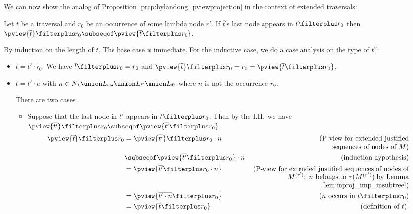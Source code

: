 We can now show the analog of Proposition \ref{prop:hylandong_pviewprojection} in the context of extended traversals:
\begin{proposition}
\label{prop:analog_pviewprojection} Let $t$ be a traversal and $r_0$
be an occurrence of some lambda node $r'$.
If $\overline{t}$'s last node appears in $t\filterplus r_0$ then
 $\pview{ \overline{t}}  \filterplus r_0 \subseqof \pview{ \overline{t}\filterplus
 r_0}$.
\end{proposition}
\proof
By induction on the length of $t$. The base case is immediate. For the inductive case,
we do a case analysis on the type of $t^\omega$:
    \begin{itemize}
    \item $t =  t' \cdot r_0$. We have $\overline{t} \filterplus r_0 = r_0$ and
     $\pview{\overline{t}} \filterplus r_0 = r_0 = \pview{\overline{t} \filterplus r_0}$.

    \item $t = t' \cdot n$ with $n \in N_\lambda \union L_{\sf var} \union
    L_\Sigma \union L_@$ where $n$ is not the occurrence $r_0$.

    There are two cases.
    \begin{itemize}
        \item Suppose that the last node in $t'$ appears in $t\filterplus r_0$. Then
        by the I.H.\ we have $\pview{\overline{t'}} \filterplus  r_0 \subseqof \pview{\overline{t'} \filterplus  r_0}$.
            \begin{align*}
            \pview{\overline{t}} \filterplus r_0
                &=  \pview{\overline{t'}} \filterplus r_0 \cdot n  & \parbox[t]{8cm}{(\raggedleft P-view for extended justified\\sequences of nodes of $M$)} \\
                &\subseqof  \pview{\overline{t'} \filterplus  r_0} \cdot n            & (\mbox{induction hypothesis}) \\
                &=  \pview{\overline{t'} \filterplus  r_0 \cdot n} & \parbox[t]{8cm}{\raggedleft (P-view for extended justified sequences of nodes of $M^{(r')}$: $n$ belongs to $\tau(M^{(r')})$
                by Lemma \ref{lem:inproj_imp_insubtree})} \\
                &=  \pview{\overline{t' \cdot n} \filterplus  r_0  }   & (\mbox{$n$ occurs in $t\filterplus r_0$}) \\
                &= \pview{\overline{t} \filterplus  r_0  }     & (\mbox{definition of } t).
            \end{align*}


\end{itemize}
\end{itemize}
